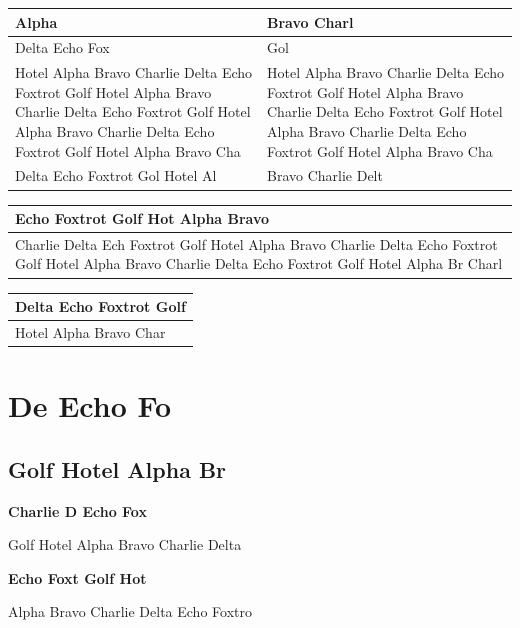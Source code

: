 \documentclass[11pt,a4paper]{article}
\begin{document}
\begin{table}[h]
\begin{tabular}{|l|l|}
\hline
Alpha  & Bravo Charl \\ \hline
Delta Echo Fox & Gol \\ \hline
Hotel Alpha  Bravo Charlie Delta Echo Foxtrot Golf Hotel Alpha Bravo Charlie  Delta Echo Foxtrot Golf Hotel Alpha Bravo Charlie Delta Echo Foxtrot Golf Hotel Alpha Bravo Cha & Hotel Alpha  Bravo Charlie Delta Echo Foxtrot Golf Hotel Alpha Bravo Charlie  Delta Echo Foxtrot Golf Hotel Alpha Bravo Charlie Delta Echo Foxtrot Golf Hotel Alpha Bravo Cha \\ \hline
Delta Echo Foxtrot Gol  Hotel Al & Bravo Charlie Delt \\ \hline
\end{tabular}
\end{table}

\begin{table}[h]
\begin{tabular}{|l|}
\hline
Echo Foxtrot  Golf Hot  Alpha Bravo \\ \hline
Charlie Delta Ech  Foxtrot Golf Hotel Alpha Bravo Charlie Delta Echo Foxtrot Golf Hotel Alpha Bravo Charlie Delta Echo Foxtrot Golf Hotel Alpha Br  Charl \\ \hline
\end{tabular}
\end{table}

\begin{table}[h]
\begin{tabular}{|l|}
\hline
Delta Echo Foxtrot Golf \\ \hline
Hotel Alpha Bravo Char \\ \hline
\end{tabular}
\end{table}

\section{De	Echo Fo}

\subsection{Golf	Hotel Alpha Br}

\textbf{Charlie D			Echo Fox}

Golf Hotel Alpha Bravo Charlie Delta

\textbf{Echo Foxt			Golf Hot}

Alpha Bravo Charlie Delta Echo Foxtro
\end{document}
